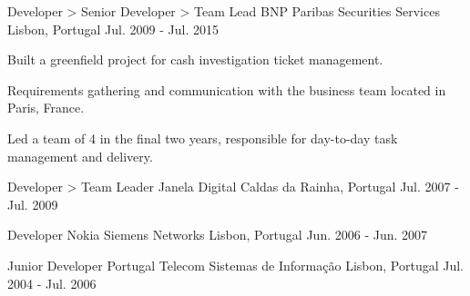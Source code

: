\begin{cventries}
  \cventry
    {Developer > Senior Developer > Team Lead} %
    {BNP Paribas Securities Services} %
    {Lisbon, Portugal} %
    {Jul. 2009 - Jul. 2015} %
    {
      \begin{cvitems} %
        \item {Built a greenfield project for cash investigation ticket management.}
        \item {Requirements gathering and communication with the business team located in Paris, France.}
        \item {Led a team of 4 in the final two years, responsible for day-to-day task management and delivery.}
      \end{cvitems}
    }

  \cventry
    {Developer > Team Leader} %
    {Janela Digital} %
    {Caldas da Rainha, Portugal} %
    {Jul. 2007 - Jul. 2009} %
    {
    }

  \cventry
    {Developer} %
    {Nokia Siemens Networks} %
    {Lisbon, Portugal} %
    {Jun. 2006 - Jun. 2007} %
    {
    }

  \cventry
    {Junior Developer} %
    {Portugal Telecom Sistemas de Informação} %
    {Lisbon, Portugal} %
    {Jul. 2004 - Jul. 2006} %
    {
    }

\end{cventries}
